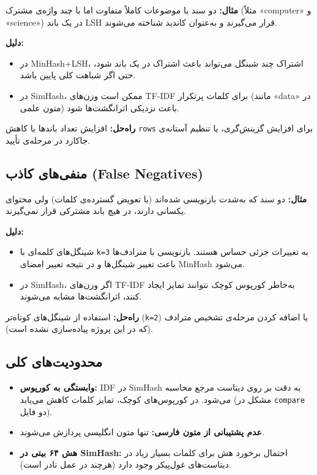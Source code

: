 \documentclass[12pt,a4paper]{article}
\begin{document}
\textbf{مثال:} دو سند با موضوعات کاملاً متفاوت اما با چند واژه‌ی مشترک (مثلاً «computer» و «science») در یک باند LSH قرار می‌گیرند و به‌عنوان کاندید شناخته می‌شوند.

\textbf{دلیل:}
\begin{itemize}
    \item در MinHash+LSH، اشتراک چند شینگل می‌تواند باعث اشتراک در یک باند شود، حتی اگر شباهت کلی پایین باشد.
    \item در SimHash، ممکن است وزن‌های TF-IDF برای کلمات پرتکرار (مانند «data» در متون علمی) باعث نزدیکی اثرانگشت‌ها شود.
\end{itemize}

\textbf{راه‌حل:} افزایش تعداد باندها یا کاهش \texttt{rows} برای افزایش گزینش‌گری، یا تنظیم آستانه‌ی جاکارد در مرحله‌ی تأیید.

\subsection{منفی‌های کاذب (False Negatives)}

\textbf{مثال:} دو سند که به‌شدت بازنویسی شده‌اند (با تعویض گسترده‌ی کلمات) ولی محتوای یکسانی دارند، در هیچ باند مشترکی قرار نمی‌گیرند.

\textbf{دلیل:}
\begin{itemize}
    \item شینگل‌های کلمه‌ای با \texttt{k=3} به تغییرات جزئی حساس هستند. بازنویسی با مترادف‌ها باعث تغییر شینگل‌ها و در نتیجه تغییر امضای MinHash می‌شود.
    \item در SimHash، اگر وزن‌های TF-IDF به‌خاطر کورپوس کوچک نتوانند تمایز ایجاد کنند، اثرانگشت‌ها مشابه می‌شوند.
\end{itemize}

\textbf{راه‌حل:} استفاده از شینگل‌های کوتاه‌تر (\texttt{k=2}) یا اضافه کردن مرحله‌ی تشخیص مترادف (که در این پروژه پیاده‌سازی نشده است).

\subsection{محدودیت‌های کلی}

\begin{itemize}
    \item \textbf{وابستگی به کورپوس:} IDF در SimHash به دقت بر روی دیتاست مرجع محاسبه می‌شود. در کورپوس‌های کوچک، تمایز کلمات کاهش می‌یابد (مشکل در \texttt{compare} دو فایل).
    \item \textbf{عدم پشتیبانی از متون فارسی:} تنها متون انگلیسی پردازش می‌شوند.
    \item \textbf{هش ۶۴ بیتی در SimHash:} احتمال برخورد هش برای کلمات بسیار زیاد در دیتاست‌های غول‌پیکر وجود دارد (هرچند در عمل نادر است).
\end{itemize}
\end{document}
